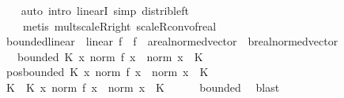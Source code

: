 \begin{isabellebody}
%
\isadelimproof
\ \ %
\endisadelimproof
%
\isatagproof
{}\isamarkupfalse%
\ {\isacharparenleft}{\kern0pt}auto\ intro{\isacharbang}{\kern0pt}{\isacharcolon}{\kern0pt}\ linearI\ simp{\isacharcolon}{\kern0pt}\ distrib{\isacharunderscore}{\kern0pt}left{\isacharparenright}{\kern0pt}\isanewline
\ \ \ \ {\isacharparenleft}{\kern0pt}metis\ mult{\isacharunderscore}{\kern0pt}scaleR{\isacharunderscore}{\kern0pt}right\ scaleR{\isacharunderscore}{\kern0pt}conv{\isacharunderscore}{\kern0pt}of{\isacharunderscore}{\kern0pt}real{\isacharparenright}{\kern0pt}%
\endisatagproof
{\isafoldproof}%
%
\isadelimproof
\isanewline
%
\endisadelimproof
\isanewline
{}\isamarkupfalse%
\ bounded{\isacharunderscore}{\kern0pt}linear\ {\isacharequal}{\kern0pt}\ linear\ f\ \ f\ {\isacharcolon}{\kern0pt}{\isacharcolon}{\kern0pt}\ {\isachardoublequoteopen}{\isacharprime}{\kern0pt}a{\isacharcolon}{\kern0pt}{\isacharcolon}{\kern0pt}real{\isacharunderscore}{\kern0pt}normed{\isacharunderscore}{\kern0pt}vector\ {\isasymRightarrow}\ {\isacharprime}{\kern0pt}b{\isacharcolon}{\kern0pt}{\isacharcolon}{\kern0pt}real{\isacharunderscore}{\kern0pt}normed{\isacharunderscore}{\kern0pt}vector{\isachardoublequoteclose}\ {\isacharplus}{\kern0pt}\isanewline
\ \ \ bounded{\isacharcolon}{\kern0pt}\ {\isachardoublequoteopen}{\isasymexists}K{\isachardot}{\kern0pt}\ {\isasymforall}x{\isachardot}{\kern0pt}\ norm\ {\isacharparenleft}{\kern0pt}f\ x{\isacharparenright}{\kern0pt}\ {\isasymle}\ norm\ x\ {\isacharasterisk}{\kern0pt}\ K{\isachardoublequoteclose}\isanewline
{}\isanewline
\isanewline
{}\isamarkupfalse%
\ pos{\isacharunderscore}{\kern0pt}bounded{\isacharcolon}{\kern0pt}\ {\isachardoublequoteopen}{\isasymexists}K{\isachargreater}{\kern0pt}{}{\isachardot}{\kern0pt}\ {\isasymforall}x{\isachardot}{\kern0pt}\ norm\ {\isacharparenleft}{\kern0pt}f\ x{\isacharparenright}{\kern0pt}\ {\isasymle}\ norm\ x\ {\isacharasterisk}{\kern0pt}\ K{\isachardoublequoteclose}\isanewline
%
\isadelimproof
%
\endisadelimproof
%
\isatagproof
{}\isamarkupfalse%
\ {\isacharminus}{\kern0pt}\isanewline
\ \ \isamarkupfalse%
\ K\ \ K{\isacharcolon}{\kern0pt}\ {\isachardoublequoteopen}{\isasymAnd}x{\isachardot}{\kern0pt}\ norm\ {\isacharparenleft}{\kern0pt}f\ x{\isacharparenright}{\kern0pt}\ {\isasymle}\ norm\ x\ {\isacharasterisk}{\kern0pt}\ K{\isachardoublequoteclose}\isanewline
\ \ \ \ \isamarkupfalse%
\ bounded\ \isamarkupfalse%
\ blast\isanewline

\end{isabellebody}
